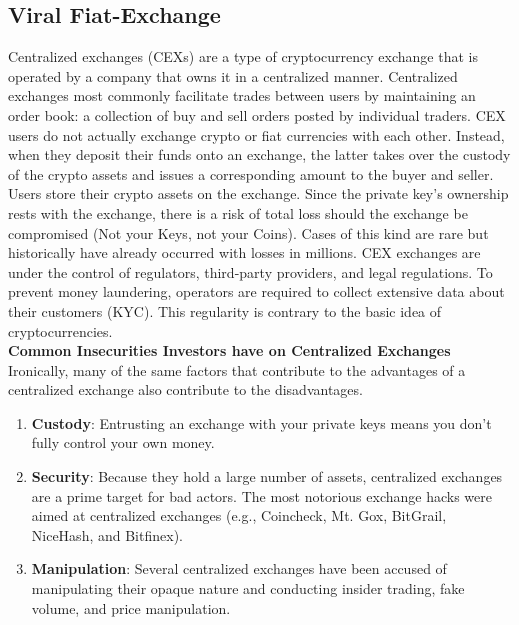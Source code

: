 \documentclass[10pt]{article}
\begin{document}
\subsection{Viral Fiat-Exchange}

Centralized exchanges (CEXs) are a type of cryptocurrency exchange that is operated by a company that owns it in a centralized manner. Centralized exchanges most commonly facilitate trades between users by maintaining an order book: a collection of buy and sell orders posted by individual traders. CEX users do not actually exchange crypto or fiat currencies with each other. Instead, when they deposit their funds onto an exchange, the latter takes over the custody of the crypto assets and issues a corresponding amount to the buyer and seller. Users store their crypto assets on the exchange. Since the private key's ownership rests with the exchange, there is a risk of total loss should the exchange be compromised (Not your Keys, not your Coins). Cases of this kind are rare but historically have already occurred with losses in millions. CEX exchanges are under the control of regulators, third-party providers, and legal regulations. To prevent money laundering, operators are required to collect extensive data about their customers (KYC). This regularity is contrary to the basic idea of cryptocurrencies.\\

\textbf{Common Insecurities Investors have on Centralized Exchanges}\\

Ironically, many of the same factors that contribute to the advantages of a centralized exchange also contribute to the disadvantages.
\begin{enumerate}[leftmargin=+0.2in]
\item \textbf{Custody}: Entrusting an exchange with your private keys means you don’t fully control your own money.

\item \textbf{Security}: Because they hold a large number of assets, centralized exchanges are a prime target for bad actors. The most notorious exchange hacks were aimed at centralized exchanges (e.g., Coincheck, Mt. Gox, BitGrail, NiceHash, and Bitfinex).

\item \textbf{Manipulation}: Several centralized exchanges have been accused of manipulating their opaque nature and conducting insider trading, fake volume, and price manipulation.
\end{enumerate}
\end{document}
